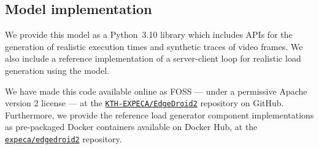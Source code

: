 \subsection{Model implementation}\label{ssec:model:impl}

We provide this model as a Python~\num{3.10} library which includes \acp{API} for the generation of realistic execution times and synthetic traces of video frames.
We also include a reference implementation of a server-client loop for realistic load generation using the model.

We have made this code available online as \ac{FOSS} --- under a permissive Apache version 2 license --- at the \href{https://github.com/KTH-EXPECA/EdgeDroid2}{\texttt{KTH-EXPECA/EdgeDroid2}} repository on GitHub.
Furthermore, we provide the reference load generator component implementations as pre-packaged Docker containers available on Docker Hub, at the \href{https://hub.docker.com/r/expeca/edgedroid2}{\texttt{expeca/edgedroid2}} repository.


